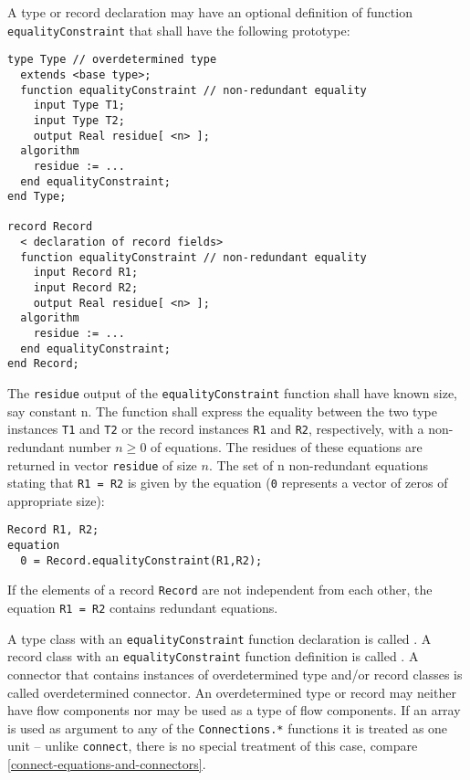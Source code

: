 A type or record declaration may have an optional definition of function
\lstinline!equalityConstraint! that shall have the following prototype:
\begin{lstlisting}[language=modelica]
type Type // overdetermined type
  extends <base type>;
  function equalityConstraint // non-redundant equality
    input Type T1;
    input Type T2;
    output Real residue[ <n> ];
  algorithm
    residue := ...
  end equalityConstraint;
end Type;

record Record
  < declaration of record fields>
  function equalityConstraint // non-redundant equality
    input Record R1;
    input Record R2;
    output Real residue[ <n> ];
  algorithm
    residue := ...
  end equalityConstraint;
end Record;
\end{lstlisting}
The \lstinline!residue! output of the \lstinline!equalityConstraint! function shall have
known size, say constant n. The function shall express the equality
between the two type instances \lstinline!T1! and \lstinline!T2! or the record instances
\lstinline!R1! and
\lstinline!R2!, respectively, with a non-redundant number $n \ge 0$ of equations. The
residues of these equations are returned in vector \lstinline!residue! of size
$n$. The set of n non-redundant equations stating that \lstinline!R1 = R2! is given by
the equation (\lstinline!0! represents a vector of zeros of appropriate size):
\begin{lstlisting}[language=modelica]
  Record R1, R2;
equation
  0 = Record.equalityConstraint(R1,R2);
\end{lstlisting}
\begin{nonnormative}
If the elements of a record \lstinline!Record! are not independent from each other, the equation \lstinline!R1 = R2! contains redundant equations.
\end{nonnormative}

A type class with an \lstinline!equalityConstraint! function declaration is called .  A record class with an \lstinline!equalityConstraint! function definition is called
.  A connector that contains instances of overdetermined type and/or record classes is called overdetermined connector.  An overdetermined type or record may neither
have flow components nor may be used as a type of flow components.  If an array is used as argument to any of the \lstinline!Connections.*! functions it is treated as one unit -- unlike
\lstinline!connect!, there is no special treatment of this case, compare \cref{connect-equations-and-connectors}.

